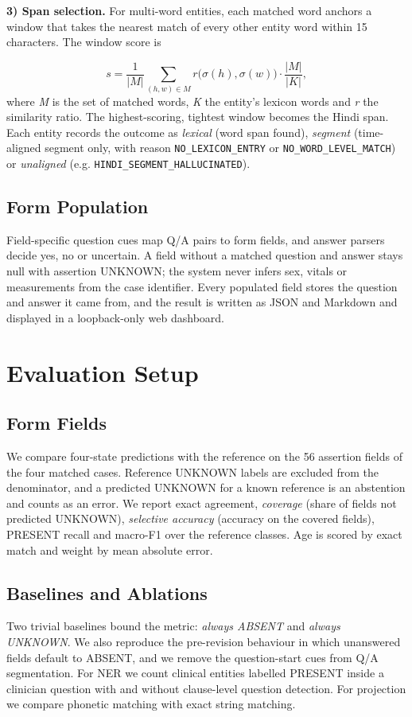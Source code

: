 \documentclass[conference]{IEEEtran}
\begin{document}
\textbf{3) Span selection.} For multi-word entities, each matched word anchors a window that takes the nearest match of every other entity word within 15 characters. The window score is

\begin{equation}
s = \frac{1}{|M|}\sum_{(h,w)\in M} r\big(\sigma(h),\sigma(w)\big)\cdot\frac{|M|}{|K|},
\end{equation}
where \emph{M} is the set of matched words, \emph{K} the entity's lexicon words and \emph{r} the similarity ratio. The highest-scoring, tightest window becomes the Hindi span. Each entity records the outcome as \emph{lexical} (word span found), \emph{segment} (time-aligned segment only, with reason \texttt{NO\_LEXICON\_ENTRY} or \texttt{NO\_WORD\_LEVEL\_MATCH}) or \emph{unaligned} (e.g. \texttt{HINDI\_SEGMENT\_HALLUCINATED}).

\subsection{Form Population}
Field-specific question cues map Q/A pairs to form fields, and answer parsers decide yes, no or uncertain. A field without a matched question and answer stays null with assertion UNKNOWN; the system never infers sex, vitals or measurements from the case identifier. Every populated field stores the question and answer it came from, and the result is written as JSON and Markdown and displayed in a loopback-only web dashboard.

\section{Evaluation Setup}
\subsection{Form Fields}
We compare four-state predictions with the reference on the 56 assertion fields of the four matched cases. Reference UNKNOWN labels are excluded from the denominator, and a predicted UNKNOWN for a known reference is an abstention and counts as an error. We report exact agreement, \emph{coverage} (share of fields not predicted UNKNOWN), \emph{selective accuracy} (accuracy on the covered fields), PRESENT recall and macro-F1 over the reference classes. Age is scored by exact match and weight by mean absolute error.

\subsection{Baselines and Ablations}
Two trivial baselines bound the metric: \emph{always ABSENT} and \emph{always UNKNOWN}. We also reproduce the pre-revision behaviour in which unanswered fields default to ABSENT, and we remove the question-start cues from Q/A segmentation. For NER we count clinical entities labelled PRESENT inside a clinician question with and without clause-level question detection. For projection we compare phonetic matching with exact string matching.
\end{document}

